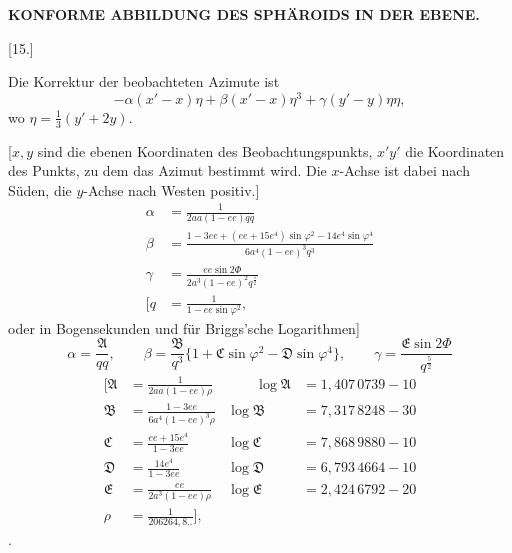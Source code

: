 \par\clearpage
\noindent\null\hfill{\small\textbf{KONFORME ABBILDUNG DES SPHÄROIDS IN DER EBENE.}}\hfill{}\par\medskip

\begin{center}
[15.]\par{}
\end{center}
Die Korrektur der beobachteten Azimute ist
\[
-\alpha(x'-x)\eta+\beta(x'-x)\eta^3+\gamma(y'-y)\eta\eta,
\]
\noindent wo \(\eta=\tfrac13(y'+2y)\).

[\(x,y\) sind die ebenen Koordinaten des Beobachtungspunkts, \(x'y'\) die
Koordinaten des Punkts, zu dem das Azimut bestimmt wird. Die \(x\)-Achse ist
dabei nach Süden, die \(y\)-Achse nach Westen positiv.]
\[
\begin{aligned}
\alpha&=\frac1{2aa(1-ee)qq}\\
\beta&=\frac{1-3ee+(ee+15e^4)\sin\varphi^2-14e^4\sin\varphi^4}{6a^4(1-ee)^3q^3}\\
\gamma&=\frac{ee\sin2\Phi}{2a^3(1-ee)^2q^{\frac52}}\\
\mathopen{[}q&=\frac1{1-ee\sin\varphi^2},
\end{aligned}
\]
\noindent oder in Bogensekunden und für Briggs'sche Logarithmen]
\[
\alpha=\frac{\mathfrak A}{qq},\qquad
\beta=\frac{\mathfrak B}{q^3}\{1+\mathfrak C\sin\varphi^2-\mathfrak D\sin\varphi^4\},\qquad
\gamma=\frac{\mathfrak E\sin2\Phi}{q^{\frac52}}
\]
\[
\begin{alignedat}{2}
{[}\mathfrak A&=\frac1{2aa(1-ee)\rho}
 &\qquad \log\mathfrak A&=1{,}407\,0739-10\\
\mathfrak B&=\frac{1-3ee}{6a^4(1-ee)^3\rho}
 &\log\mathfrak B&=7{,}317\,8248-30\\
\mathfrak C&=\frac{ee+15e^4}{1-3ee}
 &\log\mathfrak C&=7{,}868\,9880-10\\
\mathfrak D&=\frac{14e^4}{1-3ee}
 &\log\mathfrak D&=6{,}793\,4664-10\\
\mathfrak E&=\frac{ee}{2a^3(1-ee)\rho}
 &\log\mathfrak E&=2{,}424\,6792-20\\
\rho&=\frac1{206264{,}8..}\mathclose{]},
\end{alignedat}
\]
\noindent [wobei der Abplattungswert \(\dfrac1{302{,}68}\) verwendet wurde.
\(\alpha,\beta,\gamma\) gehören zum Argument
\(\tfrac13(x'+2x)=x+\tfrac13(x'-x)\)].

